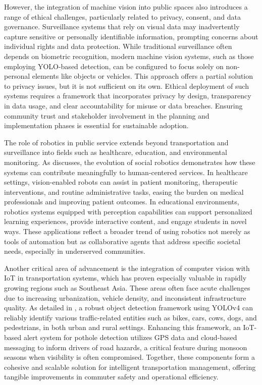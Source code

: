 \documentclass[conference]{IEEEtran}
\begin{document}
However, 
the integration of machine vision into public spaces also introduces a range of ethical challenges, 
particularly related to privacy, 
consent, 
and data governance. 
Surveillance systems that rely on visual data may inadvertently capture sensitive or personally identifiable information, 
prompting concerns about individual rights and data protection. 
While traditional surveillance often depends on biometric recognition, 
modern machine vision systems, 
such as those employing YOLO-based detection, 
can be configured to focus solely on non-personal elements like objects or vehicles. 
This approach offers a partial solution to privacy issues, 
but it is not sufficient on its own. 
Ethical deployment of such systems requires a framework that incorporates privacy by design, 
transparency in data usage, 
and clear accountability for misuse or data breaches. 
Ensuring community trust and stakeholder involvement in the planning and implementation phases is essential for sustainable adoption.

The role of robotics in public service extends beyond transportation and surveillance into fields such as healthcare, 
education, 
and environmental monitoring. 
As \cite{social_robotics} discusses, 
the evolution of social robotics demonstrates how these systems can contribute meaningfully to human-centered services. 
In healthcare settings, 
vision-enabled robots can assist in patient monitoring, 
therapeutic interventions, 
and routine administrative tasks, 
easing the burden on medical professionals and improving patient outcomes. 
In educational environments, 
robotics systems equipped with perception capabilities can support personalized learning experiences, 
provide interactive content, 
and engage students in novel ways. 
These applications reflect a broader trend of using robotics not merely as tools of automation but as collaborative agents that address specific societal needs, especially in underserved communities.

Another critical area of advancement is the integration of computer vision with IoT in transportation systems, 
which has proven especially valuable in rapidly growing regions such as Southeast Asia. 
These areas often face acute challenges due to increasing urbanization, 
vehicle density, 
and inconsistent infrastructure quality. 
As detailed in \cite{real_time_transport}, 
a robust object detection framework using YOLOv4 can reliably identify various traffic-related entities such as bikes, 
cars, 
cows, 
dogs, 
and pedestrians, 
in both urban and rural settings. 
Enhancing this framework, 
an IoT-based alert system for pothole detection utilizes GPS data and cloud-based messaging to inform drivers of road hazards, 
a critical feature during monsoon seasons when visibility is often compromised. 
Together, 
these components form a cohesive and scalable solution for intelligent transportation management, 
offering tangible improvements in commuter safety and operational efficiency.
\end{document}
